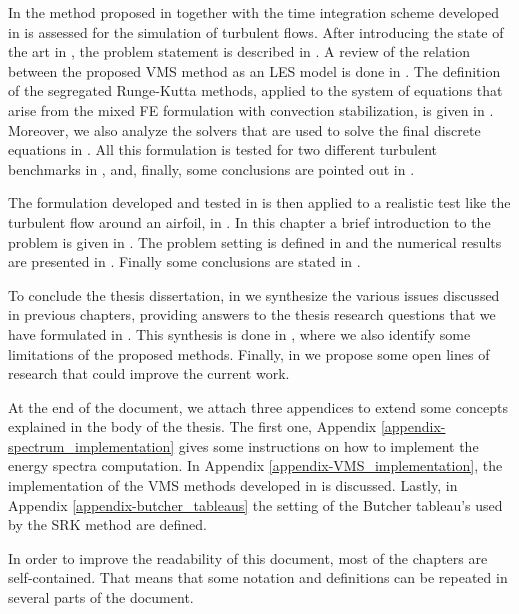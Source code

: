 In  the method proposed in  together with the time integration scheme developed in  is assessed for the simulation of turbulent flows. After introducing the state of the art in , the problem statement is described in . A review of the relation between the proposed VMS method as an LES model is done in . The definition of the segregated Runge-Kutta methods, applied to the system of equations that arise from the mixed FE formulation with convection stabilization, is given in . Moreover, we also analyze the solvers that are used to solve the final discrete equations in . All this formulation is tested for two different turbulent benchmarks in , and, finally, some conclusions are pointed out in .

The formulation developed and tested in  is then applied to a realistic test like the turbulent flow around an airfoil, in . In this chapter a brief introduction to the problem is given in . The problem setting is defined in  and the numerical results are presented in . Finally some conclusions are stated in .

To conclude the thesis dissertation, in  we synthesize the various issues discussed in previous chapters, providing answers to the thesis research questions that we have formulated in . This synthesis is done in , where we also identify some limitations of the proposed methods. Finally, in  we propose some open lines of research that could improve the current work.

At the end of the document, we attach three appendices to extend some concepts explained in the body of the thesis. The first one, Appendix \ref{appendix-spectrum_implementation} gives some instructions on how to implement the energy spectra computation. In Appendix \ref{appendix-VMS_implementation}, the implementation of the VMS methods developed in  is discussed. Lastly, in Appendix \ref{appendix-butcher_tableaus} the setting of the Butcher tableau's used by the SRK method are defined.

In order to improve the readability of this document, most of the chapters are self-contained. That means that some notation and definitions can be repeated in several parts of the document.

